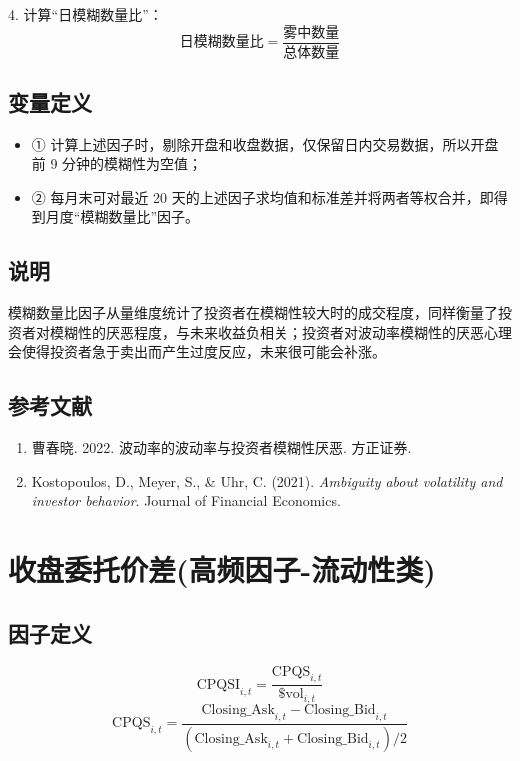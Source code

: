 \documentclass{article}
\begin{document}
4. 计算“日模糊数量比”：
\begin{equation}
    \text{日模糊数量比} = \frac{\text{雾中数量}}{\text{总体数量}}
\end{equation}

\subsection{变量定义}
\begin{itemize}
    \item ① 计算上述因子时，剔除开盘和收盘数据，仅保留日内交易数据，所以开盘前 9 分钟的模糊性为空值；
    \item ② 每月末可对最近 20 天的上述因子求均值和标准差并将两者等权合并，即得到月度“模糊数量比”因子。
\end{itemize}

\subsection{说明}
模糊数量比因子从量维度统计了投资者在模糊性较大时的成交程度，同样衡量了投资者对模糊性的厌恶程度，与未来收益负相关；投资者对波动率模糊性的厌恶心理会使得投资者急于卖出而产生过度反应，未来很可能会补涨。

\subsection{参考文献}
\begin{enumerate}
    \item 曹春晓. 2022. 波动率的波动率与投资者模糊性厌恶. 方正证券.
    \item Kostopoulos, D., Meyer, S., \& Uhr, C. (2021). \textit{Ambiguity about volatility and investor behavior}. Journal of Financial Economics.
\end{enumerate}

\section{收盘委托价差(高频因子-流动性类)}

\subsection{因子定义}
\begin{equation}
    \mathrm{CPQSI}_{i,t} = \frac{\mathrm{CPQS}_{i,t}}{\$ \mathrm{vol}_{i,t}}
\end{equation}
\begin{equation}
    \mathrm{CPQS}_{i,t} = \frac{\mathrm{Closing\_Ask}_{i,t} - \mathrm{Closing\_Bid}_{i,t}}{(\mathrm{Closing\_Ask}_{i,t} + \mathrm{Closing\_Bid}_{i,t})/2}
\end{equation}
\end{document}
